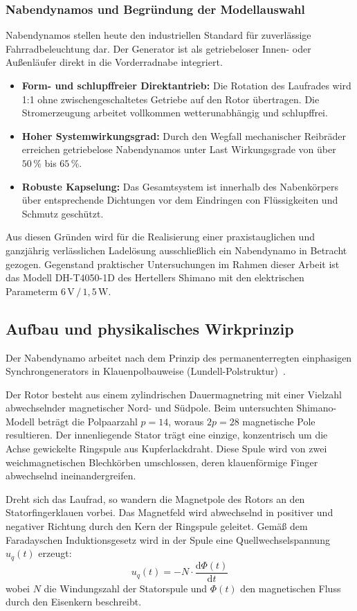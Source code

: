 \documentclass[12pt,a4paper]{article}
\begin{document}
\subsubsection{Nabendynamos und Begründung der Modellauswahl}
Nabendynamos stellen heute den industriellen Standard für zuverlässige Fahrradbeleuchtung dar. Der Generator ist als 
getriebeloser Innen- oder Außenläufer direkt in die Vorderradnabe integriert.
\begin{itemize}
    \item \textbf{Form- und schlupffreier Direktantrieb:} 
    Die Rotation des Laufrades wird 1:1 ohne zwischengeschaltetes Getriebe auf den Rotor übertragen. 
    Die Stromerzeugung arbeitet vollkommen wetterunabhängig und schlupffrei.
    \item \textbf{Hoher Systemwirkungsgrad:} 
    Durch den Wegfall mechanischer Reibräder erreichen getriebelose Nabendynamos unter Last Wirkungsgrade von über $50\,\%$ bis $65\,\%$.
    \item \textbf{Robuste Kapselung:} 
    Das Gesamtsystem ist innerhalb des Nabenkörpers über entsprechende Dichtungen vor dem Eindringen con Flüssigkeiten und Schmutz geschützt. 
\end{itemize}
Aus diesen Gründen wird für die Realisierung einer praxistauglichen und ganzjährig verlässlichen Ladelösung ausschließlich ein Nabendynamo 
in Betracht gezogen. Gegenstand praktischer Untersuchungen im Rahmen dieser Arbeit ist das Modell DH-T4050-1D des Hertellers Shimano mit den elektrischen
Parameterm  $6\,\text{V} \,/\, 1{,}5\,\text{W}$.

\subsection{Aufbau und physikalisches Wirkprinzip}
Der Nabendynamo arbeitet nach dem Prinzip des permanenterregten einphasigen Synchrongenerators in Klauenpolbauweise (Lundell-Polstruktur)~\cite{schmidt2006}. 

Der Rotor besteht aus einem zylindrischen Dauermagnetring mit einer Vielzahl abwechselnder magnetischer Nord- und Südpole. Beim untersuchten Shimano-Modell beträgt die Polpaarzahl $p = 14$, woraus $2p = 28$ magnetische Pole resultieren. Der innenliegende Stator trägt eine einzige, konzentrisch um die Achse gewickelte Ringspule aus Kupferlackdraht. Diese Spule wird von zwei weichmagnetischen Blechkörben umschlossen, deren klauenförmige Finger abwechselnd ineinandergreifen.

Dreht sich das Laufrad, so wandern die Magnetpole des Rotors an den Statorfingerklauen vorbei. Das Magnetfeld wird abwechselnd in positiver und negativer Richtung durch den Kern der Ringspule geleitet. Gemäß dem Faradayschen Induktionsgesetz wird in der Spule eine Quellwechselspannung $u_q(t)$ erzeugt:
\begin{equation}
    u_q(t) = -N \cdot \frac{\mathrm{d}\Phi(t)}{\mathrm{d}t}
    \label{eq:faraday}
\end{equation}
wobei $N$ die Windungszahl der Statorspule und $\Phi(t)$ den magnetischen Fluss durch den Eisenkern beschreibt.
\end{document}
